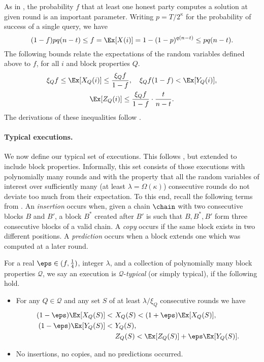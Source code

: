 As in \cite{backbone}, the probability $f$ that at least one honest party
computes a solution at given round is an important parameter.
Writing $p=T/2^\kappa$ for the probability of success of a single query, we
have
\[
	(1-f){pq(n-t)}\leq f=\Ex[X(i)]=1-(1-p)^{q(n-t)}\leq pq(n-t)
.\]
The following bounds relate the expectations of the random variables defined
above to $f$, for all $i$ and block properties $Q$.
\begin{gather*}
	\xi_Q f\leq\Ex[X_Q(i)]\le\frac{\xi_Q f}{1-f},\quad
		\xi_Q f(1-f)<\Ex[Y_Q(i)],\\
	\Ex[Z_Q(i)]\le\frac{\xi_Q f}{1-f}\cdot\frac t{n-t}
.\end{gather*}
The derivations of these inequalities follow \cite{backbone-new}.

\paragraph{Typical executions.} %
We now define our typical set of executions. This follows \cite{backbone-new}, but
extended to include block properties.
Informally, this set consists of
those executions with polynomially many rounds and with the property that all
the random variables of interest over sufficiently many (at least
$\lambda=\Omega(\kappa)$) consecutive rounds do not deviate too much from
their expectation.
To this end, recall the following terms from \cite{backbone-new}. An
\emph{insertion} occurs when, given a chain $\chain$ with two consecutive
blocks $B$ and $B'$, a block $B^*$ created after $B'$ is such that $B,B^*,B'$
form three consecutive blocks of a valid chain. A \emph{copy} occurs if the
same block exists in two different positions. A \emph{prediction} occurs when
a block extends one which was computed at a later round.

\begin{definition}\label{def:typical}
	For a real $\eps\in(f,\frac14)$, integer $\lambda$, and
	a collection of polynomially many block properties $\mathcal{Q}$, we say an
	execution is $\mathcal{Q}$-\emph{typical} (or simply typical), if the following
	hold.
	\begin{itemize}
		\item
			For any $Q\in\mathcal{Q}$ and any set $S$ of at least $\lambda/\xi_Q$
			consecutive rounds we have
			\begin{align}
				(1-\eps)\Ex[X_Q(S)]<~&X_Q(S)<(1+\eps)\Ex[X_Q(S)],
				\\(1-\eps)\Ex[Y_Q(S)]<~&Y_Q(S),
				\\&Z_Q(S)<\Ex[Z_Q(S)]+\eps\Ex[Y_Q(S)].
			\end{align}
		\item
			No insertions, no copies, and no predictions occurred.
	\end{itemize}
\end{definition}%

